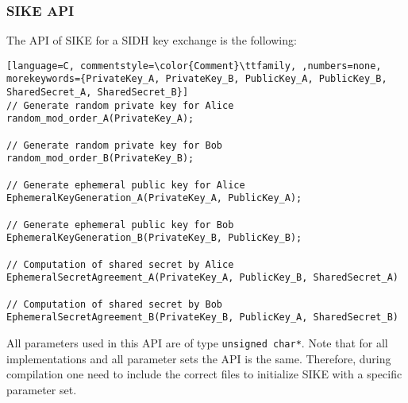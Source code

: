 \subsubsection{SIKE API}
The API of SIKE for a SIDH key exchange is the following:


\begin{lstlisting}[language=C, commentstyle=\color{Comment}\ttfamily, ,numbers=none, morekeywords={PrivateKey_A, PrivateKey_B, PublicKey_A, PublicKey_B, SharedSecret_A, SharedSecret_B}]
// Generate random private key for Alice
random_mod_order_A(PrivateKey_A);

// Generate random private key for Bob
random_mod_order_B(PrivateKey_B);

// Generate ephemeral public key for Alice
EphemeralKeyGeneration_A(PrivateKey_A, PublicKey_A);

// Generate ephemeral public key for Bob
EphemeralKeyGeneration_B(PrivateKey_B, PublicKey_B);

// Computation of shared secret by Alice
EphemeralSecretAgreement_A(PrivateKey_A, PublicKey_B, SharedSecret_A)

// Computation of shared secret by Bob
EphemeralSecretAgreement_B(PrivateKey_B, PublicKey_A, SharedSecret_B)

\end{lstlisting}
All parameters used in this API are of type \texttt{unsigned char*}. Note that for all implementations and all parameter sets the API is the same. Therefore, during compilation one need to include the correct files to initialize SIKE with a specific parameter set.


